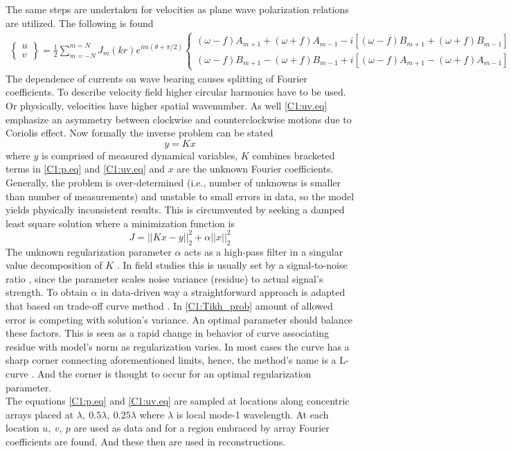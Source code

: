 \documentclass[12pt]{article}
\begin{document}
The same steps are undertaken for velocities as plane wave polarization relations 
\citep[e.g.,][]{muller2000scattering} are utilized. The following is found
\begin{align}
\label{C1:uv.eq}
\begin{Bmatrix}
u \\ v
\end{Bmatrix}
= \frac{1}{2} \sum_{m = -N}^{m = N} J_{m} (kr) e^{im(\theta + \pi/2)}
\begin{Bmatrix}
(\omega - f) A_{m + 1} + (\omega + f) A_{m - 1} - i [(\omega - f) B_{m + 1} + (\omega + f) B_{m - 
	1}] \\ 
(\omega - f) B_{m + 1} - (\omega + f) B_{m - 1} + i [ (\omega - f) A_{m + 1} - (\omega + f) A_{m - 
	1}]
\end{Bmatrix}
\end{align}
The dependence of currents on wave bearing causes splitting of Fourier coefficients. To describe 
velocity field higher circular harmonics have to be used. Or physically, velocities have higher 
spatial wavenumber. As well \eqref{C1:uv.eq} emphasize an asymmetry between clockwise 
and counterclockwise motions due to Coriolis effect. Now formally the inverse problem can be stated 
\begin{equation}
y = K x
\end{equation}
where $y$ is comprised of measured dynamical variables, $K$ combines bracketed terms in 
\eqref{C1:p.eq} and \eqref{C1:uv.eq} and $x$ are the unknown Fourier coefficients. Generally, the 
problem is over-determined (i.e., number of unknowns is smaller than number of 
measurements) and unstable to small errors in data, so the model yields physically inconsistent 
results. This is circumvented by seeking a damped least square solution \citep{munk2009ocean} where 
a minimization function is 
\begin{equation}
\label{C1:Tikh_prob}
J = ||K x - y||^2_2 + \alpha ||x||^2_2
\end{equation}
The unknown regularization parameter $\alpha$ acts as a high-pass filter in a singular value 
decomposition of $K$ \citep{bennett1992inverse}. In field studies this is usually set by a 
signal-to-noise ratio \citep{munk2009ocean}, since the parameter scales noise variance (residue) 
to actual signal's strength. To obtain $\alpha$ in data-driven way a straightforward approach is 
adapted that based on 
trade-off curve method \citep{hansen1993use}. In \eqref{C1:Tikh_prob} amount of allowed error 
is competing with solution's variance. An optimal parameter should balance these factors. This is 
seen as a rapid change in behavior of curve associating residue with model's norm as regularization 
varies. In most cases the curve has a sharp corner connecting aforementioned limits, hence, the 
method's name is a L-curve \citep{hansen1999curve}. And the corner is thought to occur for an 
optimal regularization parameter.\\
The equations \eqref{C1:p.eq} and \eqref{C1:uv.eq} are sampled at locations along concentric 
arrays placed at $\lambda,~0.5\lambda,~0.25\lambda$ where $\lambda$ is local mode-1 wavelength. 
At each location $u,~v,~p$ are used as data and for a region embraced by array Fourier coefficients 
are found. And these then are used in reconstructions.
\end{document}
